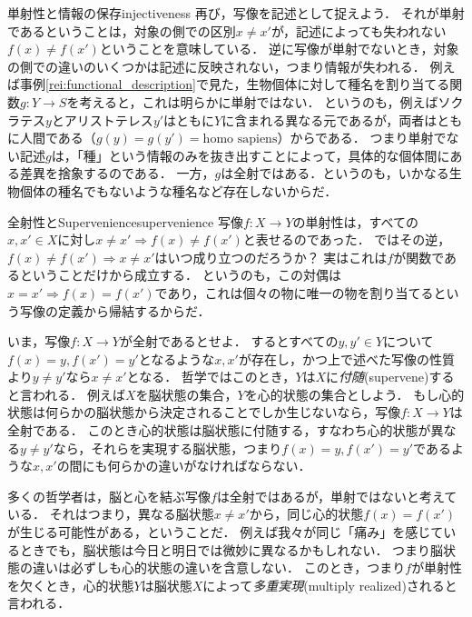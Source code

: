 \documentclass[11pt,a4paper]{bxjsarticle}
\begin{document}
\begin{rei}{単射性と情報の保存}{injectiveness}
再び，写像を記述として捉えよう．
それが単射であるということは，対象の側での区別$x \neq x'$が，記述によっても失われない$f(x) \neq f(x')$ということを意味している．
逆に写像が単射でないとき，対象の側での違いのいくつかは記述に反映されない，つまり情報が失われる．
例えば事例\ref{rei:functional_description}で見た，生物個体に対して種名を割り当てる関数$g:Y \to S$を考えると，これは明らかに単射ではない．
というのも，例えばソクラテス$y$とアリストテレス$y'$はともに$Y$に含まれる異なる元であるが，両者はともに人間である（$g(y) = g(y') = \text{homo sapiens}$）からである．
つまり単射でない記述$g$は，「種」という情報のみを抜き出すことによって，具体的な個体間にある差異を捨象するのである．
一方，$g$は全射ではある．というのも，いかなる生物個体の種名でもないような種名など存在しないからだ．
\end{rei}

\begin{rei}{全射性とSupervenience}{supervenience}
写像$f:X \to Y$の単射性は，すべての$x, x' \in X$に対し$x \neq x' \Rightarrow f(x) \neq f(x')$と表せるのであった．
ではその逆，$f(x) \neq f(x') \Rightarrow x \neq x'$はいつ成り立つのだろうか？
実はこれは$f$が関数であるということだけから成立する．
というのも，この対偶は$x = x' \Rightarrow f(x) = f(x')$であり，これは個々の物に唯一の物を割り当てるという写像の定義から帰結するからだ．

いま，写像$f:X \to Y$が全射であるとせよ．
するとすべての$y, y' \in Y$について$f(x) = y, f(x') = y'$となるような$x, x'$が存在し，かつ上で述べた写像の性質より$y \neq y'$なら$x \neq x'$となる．
哲学ではこのとき，$Y$は$X$に\emph{付随}(supervene)すると言われる．
例えば$X$を脳状態の集合，$Y$を心的状態の集合としよう．
もし心的状態は何らかの脳状態から決定されることでしか生じないなら，写像$f:X \to Y$は全射である．
このとき心的状態は脳状態に付随する，すなわち心的状態が異なる$y \neq y'$なら，それらを実現する脳状態，つまり$f(x) = y, f(x') =y'$であるような$x, x'$の間にも何らかの違いがなければならない．

多くの哲学者は，脳と心を結ぶ写像$f$は全射ではあるが，単射ではないと考えている．
それはつまり，異なる脳状態$x \neq x'$から，同じ心的状態$f(x) = f(x')$が生じる可能性がある，ということだ．
例えば我々が同じ「痛み」を感じているときでも，脳状態は今日と明日では微妙に異なるかもしれない．
つまり脳状態の違いは必ずしも心的状態の違いを含意しない．
このとき，つまり$f$が単射性を欠くとき，心的状態$Y$は脳状態$X$によって\emph{多重実現}(multiply realized)されると言われる．
\end{rei}
\end{document}
